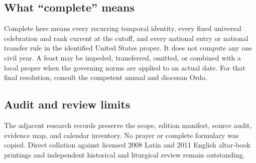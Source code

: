 {\subsection{What ``complete'' means}

Complete here means every recurring temporal identity, every fixed universal celebration and rank current at the cutoff, and every national entry or national transfer rule in the identified United States proper. It does not compute any one civil year. A feast may be impeded, transferred, omitted, or combined with a local proper when the governing norms are applied to an actual date. For that final resolution, consult the competent annual and diocesan Ordo.

\subsection{Audit and review limits}

The adjacent research records preserve the scope, edition manifest, source audit, evidence map, and calendar inventory. No prayer or complete formulary was copied. Direct collation against licensed 2008 Latin and 2011 English altar-book printings and independent historical and liturgical review remain outstanding.
}
